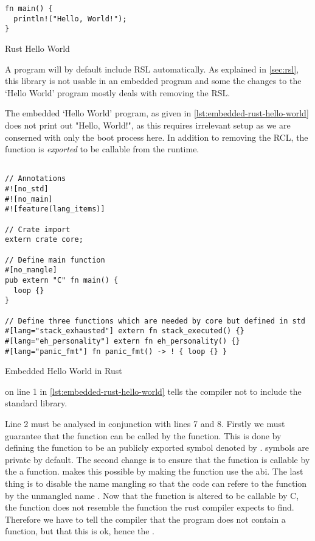 \begin{listing}[H]
  \begin{verbatim}
fn main() {
  println!("Hello, World!");
}
  \end{verbatim}
  \caption{Rust Hello World}
  \label{lst:rust-hello-world}
\end{listing}

A {\rust} program will by default include \gls{RSL} automatically.
As explained in \autoref{sec:rsl}, this library is not usable in an embedded program and some the changes to the `Hello World' program mostly deals with removing the \gls{RSL}.

The embedded `Hello World' program, as given in \autoref{lst:embedded-rust-hello-world} does not print out "Hello, World!", as this requires irrelevant setup as we are conserned with only the boot process here.
In addition to removing the \gls{RCL}, the {\main} function is \emph{exported} to be callable from the {\C} runtime.

\begin{listing}[H]
  \begin{verbatim}

// Annotations
#![no_std]
#![no_main]
#![feature(lang_items)]

// Crate import
extern crate core;

// Define main function
#[no_mangle]
pub extern "C" fn main() {
  loop {}
}

// Define three functions which are needed by core but defined in std
#[lang="stack_exhausted"] extern fn stack_executed() {}
#[lang="eh_personality"] extern fn eh_personality() {}
#[lang="panic_fmt"] fn panic_fmt() -> ! { loop {} }
\end{verbatim}
\caption{Embedded Hello World in Rust}
\label{lst:embedded-rust-hello-world}
\end{listing}

\attrib{\#\![no\_std]} on line 1 in \autoref{lst:embedded-rust-hello-world} tells the {\rust} compiler not to include the standard library.

Line 2 must be analysed in conjunction with lines 7 and 8.
Firstly we must guarantee that the function can be called by the  function.
This is done by defining the {\main} function to be an publicly exported symbol denoted by .
{\rust} symbols are private by default.
The second change is to ensure that the function is callable by the a {\C} function.
 makes this possible by making the function use the {\C} \gls{abi}.
The last thing is to disable the {\rust} name mangling so that the {\C} code can refere to the function by the unmangled name {\main}.
Now that the {\main} function is altered to be callable by C, the function does not resemble the function the rust compiler expects to find.
Therefore we have to tell the compiler that the program does not contain a {\main} function, but that this is ok, hence the \attrib{\#\![no\_main]}.

